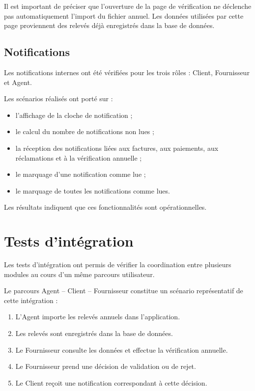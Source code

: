 Il est important de préciser que l'ouverture de la page de vérification ne déclenche pas automatiquement l'import du fichier annuel. Les données utilisées par cette page proviennent des relevés déjà enregistrés dans la base de données.

\subsection{Notifications}

Les notifications internes ont été vérifiées pour les trois rôles : Client, Fournisseur et Agent.

Les scénarios réalisés ont porté sur :
\begin{itemize}
    \item l'affichage de la cloche de notification ;
    \item le calcul du nombre de notifications non lues ;
    \item la réception des notifications liées aux factures, aux paiements, aux réclamations et à la vérification annuelle ;
    \item le marquage d'une notification comme lue ;
    \item le marquage de toutes les notifications comme lues.
\end{itemize}

Les résultats indiquent que ces fonctionnalités sont opérationnelles.

\section{Tests d'intégration}

Les tests d'intégration ont permis de vérifier la coordination entre plusieurs modules au cours d'un même parcours utilisateur.

Le parcours Agent -- Client -- Fournisseur constitue un scénario représentatif de cette intégration :
\begin{enumerate}
    \item L'Agent importe les relevés annuels dans l'application.
    \item Les relevés sont enregistrés dans la base de données.
    \item Le Fournisseur consulte les données et effectue la vérification annuelle.
    \item Le Fournisseur prend une décision de validation ou de rejet.
    \item Le Client reçoit une notification correspondant à cette décision.
\end{enumerate}

